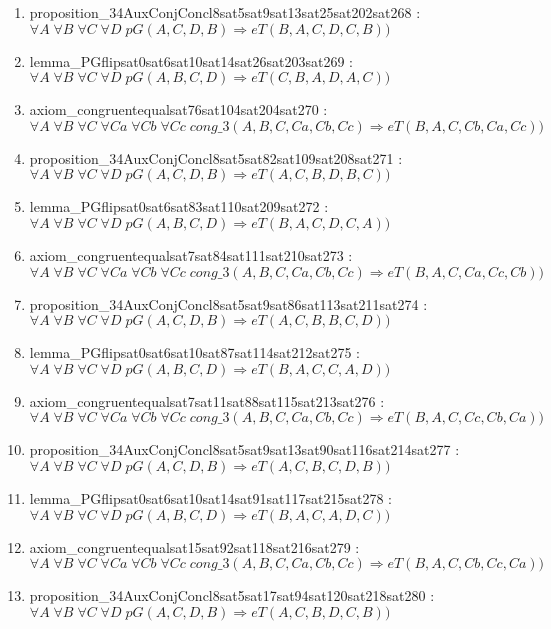 \documentclass{article}
\begin{document}
\begin{enumerate}
\item proposition\_34AuxConjConcl8sat5sat9sat13sat25sat202sat268 : $\forall A\;\forall B\;\forall C\;\forall D\;pG(A, C, D, B) \Rightarrow eT(B, A, C, D, C, B))$
\item lemma\_PGflipsat0sat6sat10sat14sat26sat203sat269 : $\forall A\;\forall B\;\forall C\;\forall D\;pG(A, B, C, D) \Rightarrow eT(C, B, A, D, A, C))$
\item axiom\_congruentequalsat76sat104sat204sat270 : $\forall A\;\forall B\;\forall C\;\forall Ca\;\forall Cb\;\forall Cc\;cong\_3(A, B, C, Ca, Cb, Cc) \Rightarrow eT(B, A, C, Cb, Ca, Cc))$
\item proposition\_34AuxConjConcl8sat5sat82sat109sat208sat271 : $\forall A\;\forall B\;\forall C\;\forall D\;pG(A, C, D, B) \Rightarrow eT(A, C, B, D, B, C))$
\item lemma\_PGflipsat0sat6sat83sat110sat209sat272 : $\forall A\;\forall B\;\forall C\;\forall D\;pG(A, B, C, D) \Rightarrow eT(B, A, C, D, C, A))$
\item axiom\_congruentequalsat7sat84sat111sat210sat273 : $\forall A\;\forall B\;\forall C\;\forall Ca\;\forall Cb\;\forall Cc\;cong\_3(A, B, C, Ca, Cb, Cc) \Rightarrow eT(B, A, C, Ca, Cc, Cb))$
\item proposition\_34AuxConjConcl8sat5sat9sat86sat113sat211sat274 : $\forall A\;\forall B\;\forall C\;\forall D\;pG(A, C, D, B) \Rightarrow eT(A, C, B, B, C, D))$
\item lemma\_PGflipsat0sat6sat10sat87sat114sat212sat275 : $\forall A\;\forall B\;\forall C\;\forall D\;pG(A, B, C, D) \Rightarrow eT(B, A, C, C, A, D))$
\item axiom\_congruentequalsat7sat11sat88sat115sat213sat276 : $\forall A\;\forall B\;\forall C\;\forall Ca\;\forall Cb\;\forall Cc\;cong\_3(A, B, C, Ca, Cb, Cc) \Rightarrow eT(B, A, C, Cc, Cb, Ca))$
\item proposition\_34AuxConjConcl8sat5sat9sat13sat90sat116sat214sat277 : $\forall A\;\forall B\;\forall C\;\forall D\;pG(A, C, D, B) \Rightarrow eT(A, C, B, C, D, B))$
\item lemma\_PGflipsat0sat6sat10sat14sat91sat117sat215sat278 : $\forall A\;\forall B\;\forall C\;\forall D\;pG(A, B, C, D) \Rightarrow eT(B, A, C, A, D, C))$
\item axiom\_congruentequalsat15sat92sat118sat216sat279 : $\forall A\;\forall B\;\forall C\;\forall Ca\;\forall Cb\;\forall Cc\;cong\_3(A, B, C, Ca, Cb, Cc) \Rightarrow eT(B, A, C, Cb, Cc, Ca))$
\item proposition\_34AuxConjConcl8sat5sat17sat94sat120sat218sat280 : $\forall A\;\forall B\;\forall C\;\forall D\;pG(A, C, D, B) \Rightarrow eT(A, C, B, D, C, B))$

\end{enumerate}
\end{document}
